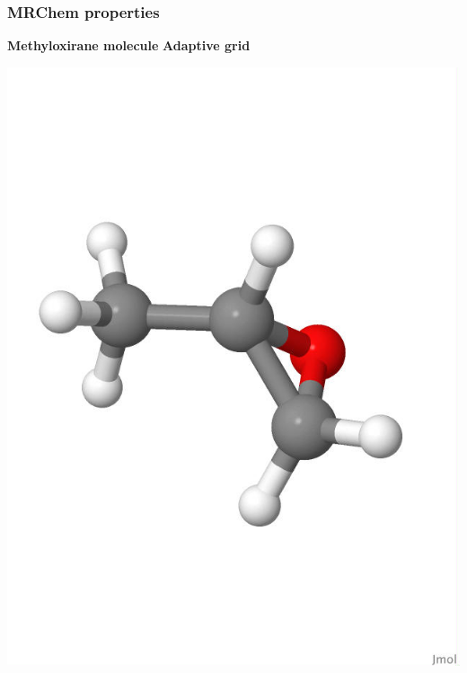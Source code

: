 \begin{frame}
\frametitle{MRChem properties}
\small
\centering
\textbf{Methyloxirane molecule}
\hspace{30mm}
\textbf{Adaptive grid}
\begin{minipage}{0.5\textwidth}
\centering
\includegraphics[scale=0.15, viewport = 0 180 550 650, clip]{figures/methyloxirane_white.jpg}
\end{minipage}%
\begin{minipage}{0.5\textwidth}
\centering

\end{minipage}
\end{frame}
